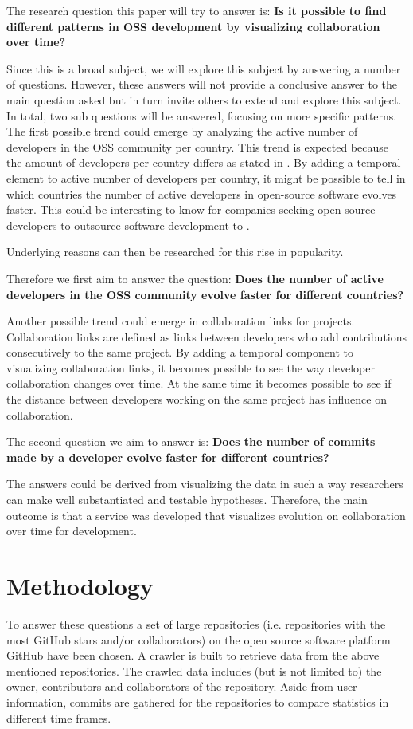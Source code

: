 \documentclass[acmtog, authorversion]{acmart}
\begin{document}
The research question this paper will try to answer is: \textbf{Is it possible to find different patterns in OSS development by visualizing collaboration over time?}

Since this is a broad subject, we will explore this subject by answering a number of questions.
However, these answers will not provide a conclusive answer to the main question asked but in turn invite others to extend and explore this subject.
In total, two sub questions will be answered, focusing on more specific patterns.
The first possible trend could emerge by analyzing the active number of developers in the OSS community per country.
This trend is expected because the amount of developers per country differs as stated in \cite{StackOverflow2017}.
By adding a temporal element to active number of developers per country, it might be possible to tell in which countries the number of active developers in open-source software evolves faster.
This could be interesting to know for companies seeking open-source developers to outsource software development to \cite{haefliger2008code}.

Underlying reasons can then be researched for this rise in popularity.

Therefore we first aim to answer the question: \textbf{Does the number of active developers in the OSS community evolve faster for different countries?}

Another possible trend could emerge in collaboration links for projects.
Collaboration links are defined as links between developers who add contributions consecutively to the same project.
By adding a temporal component to visualizing collaboration links, it becomes possible to see the way developer collaboration changes over time.
At the same time it becomes possible to see if the distance between developers working on the same project has influence on collaboration.

The second question we aim to answer is: \textbf{Does the number of commits made by a developer evolve faster for different countries?}

The answers could be derived from visualizing the data in such a way researchers can make well substantiated and testable hypotheses. 
Therefore, the main outcome is that a service was developed that visualizes evolution on collaboration over time for development.

\section{Methodology}
To answer these questions a set of large repositories (i.e. repositories with the most GitHub stars and/or collaborators) on the open source software platform GitHub have been chosen.
A crawler is built to retrieve data from the above mentioned repositories.
The crawled data includes (but is not limited to) the owner, contributors and collaborators of the repository.
Aside from user information, commits are gathered for the repositories to compare statistics in different time frames.
\end{document}
